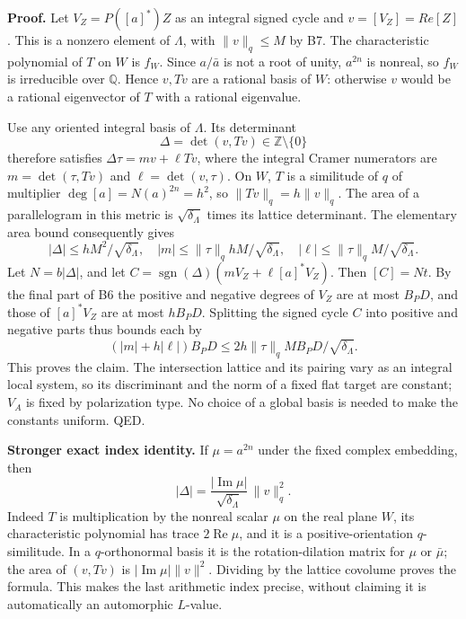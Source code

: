 \documentclass[11pt,a4paper]{article}
\theoremstyle{definition}
\begin{document}
\textbf{Proof.} Let \(V_Z=P([a]^*)Z\) as an integral signed cycle and \(v=[V_Z]=R e[Z]\). This is a nonzero element of \(\Lambda\), with \(\|v\|_q\leq M\) by B7. The characteristic polynomial of \(T\) on \(W\) is \(f_W\). Since \(a/\bar a\) is not a root of unity, \(a^{2n}\) is nonreal, so \(f_W\) is irreducible over \(\mathbb Q\). Hence \(v,Tv\) are a rational basis of \(W\): otherwise \(v\) would be a rational eigenvector of \(T\) with a rational eigenvalue.

Use any oriented integral basis of \(\Lambda\). Its determinant \[
 \Delta=\det(v,Tv)\in\mathbb Z\setminus\{0\}
\] therefore satisfies \(\Delta\tau=m v+\ell Tv\), where the integral Cramer numerators are \(m=\det(\tau,Tv)\) and \(\ell=\det(v,\tau)\). On \(W\), \(T\) is a similitude of \(q\) of multiplier \(\deg[a]=N(a)^{2n}=h^2\), so \(\|Tv\|_q=h\|v\|_q\). The area of a parallelogram in this metric is \(\sqrt{\delta_\Lambda}\) times its lattice determinant. The elementary area bound consequently gives \[
 |\Delta|\leq hM^2/\sqrt{\delta_\Lambda},\quad
 |m|\leq\|\tau\|_q hM/\sqrt{\delta_\Lambda},\quad
 |\ell|\leq\|\tau\|_q M/\sqrt{\delta_\Lambda}.
\] Let \(N=b|\Delta|\), and let \(C=\operatorname{sgn}(\Delta)(mV_Z+\ell[a]^*V_Z)\). Then \([C]=Nt\). By the final part of B6 the positive and negative degrees of \(V_Z\) are at most \(B_PD\), and those of \([a]^*V_Z\) are at most \(hB_PD\). Splitting the signed cycle \(C\) into positive and negative parts thus bounds each by \[
 (|m|+h|\ell|)B_PD\leq 2h\|\tau\|_q M B_PD/\sqrt{\delta_\Lambda}.
\] This proves the claim. The intersection lattice and its pairing vary as an integral local system, so its discriminant and the norm of a fixed flat target are constant; \(V_A\) is fixed by polarization type. No choice of a global basis is needed to make the constants uniform. QED.

\textbf{Stronger exact index identity.} If \(\mu=a^{2n}\) under the fixed complex embedding, then \[
 |\Delta|=\frac{|\operatorname{Im}\mu|}{\sqrt{\delta_\Lambda}}\,\|v\|_q^2.
\] Indeed \(T\) is multiplication by the nonreal scalar \(\mu\) on the real plane \(W\), its characteristic polynomial has trace \(2\operatorname{Re}\mu\), and it is a positive-orientation \(q\)-similitude. In a \(q\)-orthonormal basis it is the rotation-dilation matrix for \(\mu\) or \(\bar\mu\); the area of \((v,Tv)\) is \(|\operatorname{Im}\mu|\|v\|^2\). Dividing by the lattice covolume proves the formula. This makes the last arithmetic index precise, without claiming it is automatically an automorphic \(L\)-value.
\end{document}
